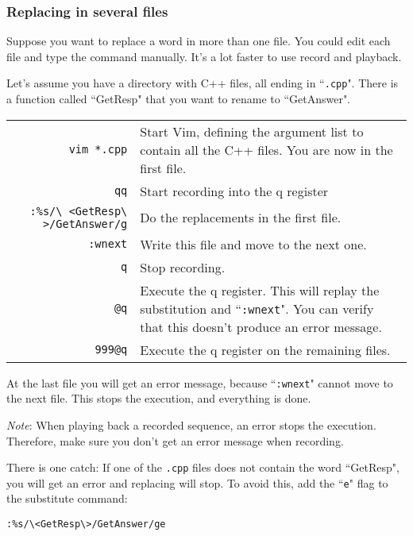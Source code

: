 \subsubsection{Replacing in several files}
Suppose you want to replace a word in more than one file.
You could edit each file and type the command manually.
It's a lot faster to use record and playback.

Let's assume you have a directory with C++ files, all ending in ``\texttt{.cpp}".
There is a function called ``GetResp" that you want to rename to ``GetAnswer".

\begin{center} \begin{tabularx}{\textwidth}{r p{11cm}} %
				\texttt{vim *.cpp} & Start Vim, defining the argument list to contain all the C++ files.
				You are now in the first file. \\
				\texttt{qq} & Start recording into the q register \\
				\texttt{:\%s/\textbackslash{} <GetResp\textbackslash{} >/GetAnswer/g} & Do the replacements in the first file. \\
				\texttt{:wnext} & Write this file and move to the next one. \\
				\texttt{q} & Stop recording. \\
				\texttt{@q} & Execute the q register.
				This will replay the substitution and ``\texttt{:wnext}".
				You can verify that this doesn't produce an error message. \\
				\texttt{999@q} & Execute the q register on the remaining files.  \\
\end{tabularx} \end{center}

At the last file you will get an error message, because ``\texttt{:wnext}" cannot move to the next file.
This stops the execution, and everything is done.

\emph{Note}: When playing back a recorded sequence, an error stops the execution.
Therefore, make sure you don't get an error message when recording.

There is one catch: If one of the \texttt{.cpp} files does not contain the word ``GetResp", you will get an error and replacing will stop.
To avoid this, add the ``\texttt{e}" flag to the substitute command:

\begin{Verbatim}[samepage=true]
 :%s/\<GetResp\>/GetAnswer/ge
\end{Verbatim}


